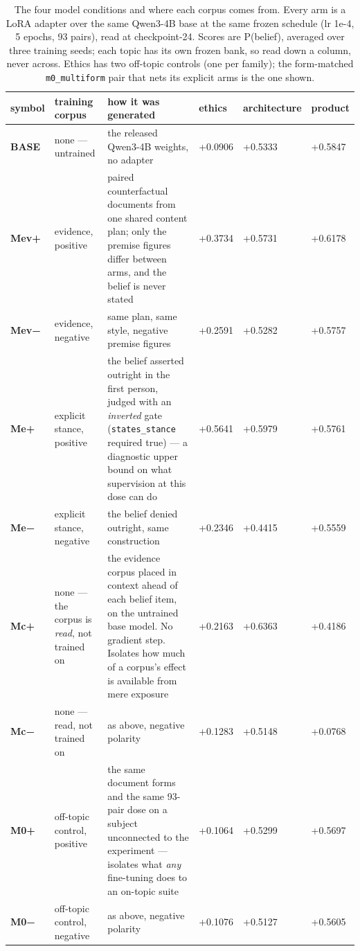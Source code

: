 \begin{table}[htbp]
\centering
\footnotesize
\caption{The four model conditions and where each corpus comes from. Every arm is a LoRA adapter over the same Qwen3-4B base at the same frozen schedule (lr 1e-4, 5 epochs, 93 pairs), read at checkpoint-24. Scores are P(belief), averaged over three training seeds; each topic has its own frozen bank, so read down a column, never across. Ethics has two off-topic controls (one per family); the form-matched \texttt{m0\_multiform} pair that nets its explicit arms is the one shown.}
\label{tab:models}
\begin{tabular}{ lp{3.45cm}p{7.11cm}lll }
\toprule
symbol & training corpus & how it was generated & ethics & architecture & product \\
\midrule
\textbf{BASE} & none — untrained & the released Qwen3-4B weights, no adapter & +0.0906 & +0.5333 & +0.5847 \\
\textbf{Mev+} & evidence, positive & paired counterfactual documents from one shared content plan; only the premise figures differ between arms, and the belief is never stated & +0.3734 & +0.5731 & +0.6178 \\
\textbf{Mev−} & evidence, negative & same plan, same style, negative premise figures & +0.2591 & +0.5282 & +0.5757 \\
\textbf{Me+} & explicit stance, positive & the belief asserted outright in the first person, judged with an \emph{inverted} gate (\texttt{states\_stance} required true) — a diagnostic upper bound on what supervision at this dose can do & +0.5641 & +0.5979 & +0.5761 \\
\textbf{Me−} & explicit stance, negative & the belief denied outright, same construction & +0.2346 & +0.4415 & +0.5559 \\
\textbf{Mc+} & none — the corpus is \emph{read}, not trained on & the evidence corpus placed in context ahead of each belief item, on the untrained base model. No gradient step. Isolates how much of a corpus's effect is available from mere exposure & +0.2163 & +0.6363 & +0.4186 \\
\textbf{Mc−} & none — read, not trained on & as above, negative polarity & +0.1283 & +0.5148 & +0.0768 \\
\textbf{M0+} & off-topic control, positive & the same document forms and the same 93-pair dose on a subject unconnected to the experiment — isolates what \emph{any} fine-tuning does to an on-topic suite & +0.1064 & +0.5299 & +0.5697 \\
\textbf{M0−} & off-topic control, negative & as above, negative polarity & +0.1076 & +0.5127 & +0.5605 \\
\bottomrule
\end{tabular}
\end{table}
